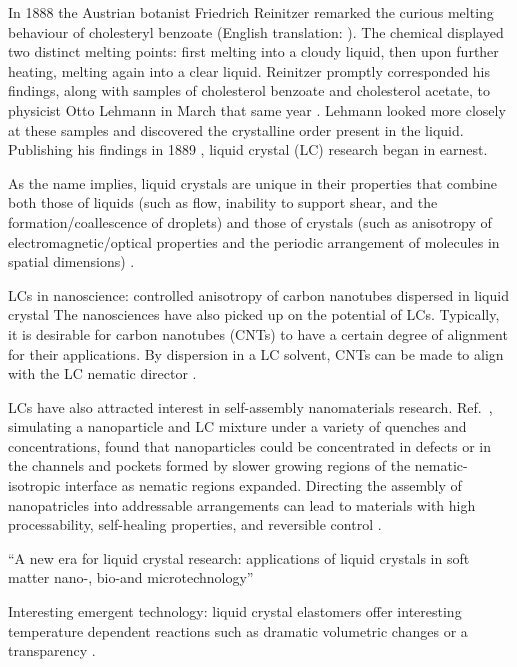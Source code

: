 
In 1888 the Austrian botanist Friedrich Reinitzer remarked the curious melting behaviour of cholesteryl benzoate \cite{reinitzer1888} (English translation: \cite{reinitzer1888eng}). The chemical displayed two distinct melting points: first melting into a cloudy liquid, then upon further heating, melting again into a clear liquid. 
Reinitzer promptly corresponded his findings, along with samples of cholesterol benzoate and cholesterol acetate, to physicist Otto Lehmann in March that same year \cite{knoll2010otto}. Lehmann looked more closely at these samples and discovered the crystalline order present in the liquid. Publishing his findings in 1889 \cite{lehmann1889}, liquid crystal (LC) research began in earnest.

As the name implies, liquid crystals are unique in their properties that combine both those of liquids (such as flow, inability to support shear, and the formation/coallescence of droplets) and those of crystals (such as anisotropy of electromagnetic/optical properties and the periodic arrangement of molecules in spatial dimensions) \cite{lcintro}. 



LCs in nanoscience: controlled anisotropy of carbon nanotubes dispersed in liquid crystal
The nanosciences have also picked up on the potential of LCs. Typically, it is desirable for carbon nanotubes (CNTs) to have a certain degree of alignment for their applications. By dispersion in a LC solvent, CNTs can be made to align with the LC nematic director \cite{lynch2002,dierking2004,cnt_lc}.

LCs have also attracted interest in self-assembly nanomaterials research. Ref.\ \cite{selfassembly}, simulating a nanoparticle and LC mixture under a variety of quenches and concentrations, found that nanoparticles could be concentrated in defects or in the channels and pockets formed by slower growing regions of the nematic-isotropic interface as nematic regions expanded. Directing the assembly of nanopatricles into addressable arrangements can lead to materials with high processability, self-healing properties, and reversible control \cite{selfassembly}.

``A new era for liquid crystal research: applications of liquid crystals in soft matter nano-, bio-and microtechnology'' \cite{LCreview}

Interesting emergent technology: liquid crystal elastomers offer interesting temperature dependent reactions such as dramatic volumetric changes or a transparency \cite{lcelastomers}.

